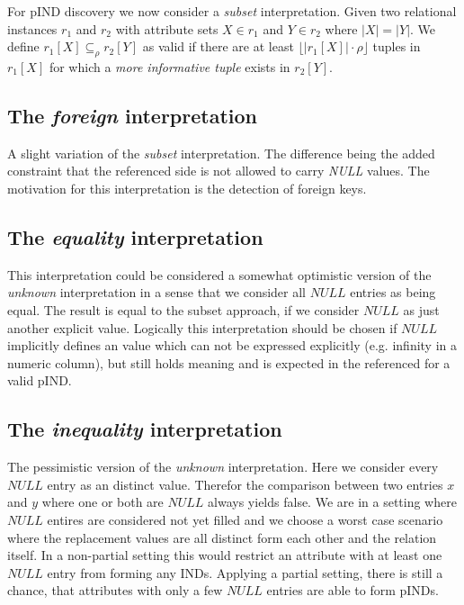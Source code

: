 For pIND discovery we now consider a \textit{subset} interpretation. Given two relational instances $r_1$ and $r_2$ with attribute sets
$X \in r_1$ and $Y \in r_2$ where $|X| = |Y|$. We define $r_1[X] \subseteq_\rho r_2[Y]$ as valid if there are at least $\lfloor |r_1[X]| \cdot \rho \rfloor$
tuples in $r_1[X]$ for which a \textit{more informative tuple} exists in $r_2[Y]$.

\subsection*{The \textit{foreign} interpretation}
A slight variation of the \textit{subset} interpretation. The difference being the added constraint that the referenced side is not allowed to
carry \textit{NULL} values. The motivation for this interpretation is the detection of foreign keys.

\subsection*{The \textit{equality} interpretation}
This interpretation could be considered a somewhat optimistic version of the \textit{unknown} interpretation in a sense that we consider all $NULL$ entries as being equal.
The result is equal to the subset approach, if we consider $NULL$ as just another explicit value.
Logically this interpretation should be chosen if $NULL$ implicitly defines an value which can not be expressed explicitly (e.g. infinity in a numeric column), but still holds meaning and is expected in the referenced for a valid pIND.

\subsection*{The \textit{inequality} interpretation}
The pessimistic version of the \textit{unknown} interpretation. Here we consider every $NULL$ entry as an distinct value. Therefor the comparison between two entries $x$ and $y$ where one or both are $NULL$ always yields false. We are in a setting where $NULL$ entires are considered not yet filled and we choose a worst case scenario where the replacement values are all distinct form each other and the relation itself. In a non-partial setting this would restrict an attribute with at least one $NULL$ entry from forming any INDs. Applying a partial setting, there is still a chance, that attributes with only a few $NULL$ entries are able to form pINDs.